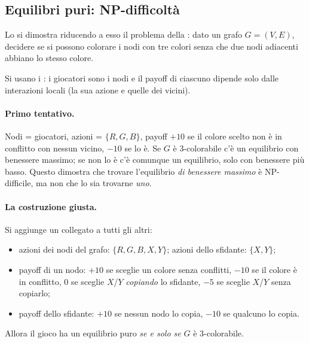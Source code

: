 \subsection{Equilibri puri: NP-difficoltà}

 Lo si dimostra riducendo a esso
il problema della : dato un grafo $G = (V,E)$, decidere se si possono
colorare i nodi con tre colori senza che due nodi adiacenti abbiano lo stesso colore.

Si usano i : i giocatori sono i nodi e il payoff di ciascuno dipende
solo dalle interazioni locali (la sua azione e quelle dei vicini).

\paragraph{Primo tentativo.}
Nodi = giocatori, azioni = $\{R, G, B\}$, payoff $+10$ se il colore scelto non è in
conflitto con nessun vicino, $-10$ se lo è. Se $G$ è 3-colorabile c'è un equilibrio con
benessere massimo; se non lo è c'è comunque un equilibrio, solo con benessere più basso.
Questo dimostra che trovare l'equilibrio \emph{di benessere massimo} è NP-difficile, ma non
che lo sia trovarne \emph{uno}.

\paragraph{La costruzione giusta.}
Si aggiunge un  collegato a tutti gli altri:
\begin{itemize}
  \item azioni dei nodi del grafo: $\{R, G, B, X, Y\}$; azioni dello sfidante: $\{X, Y\}$;
  \item payoff di un nodo: $+10$ se sceglie un colore senza conflitti, $-10$ se il colore è
        in conflitto, $0$ se sceglie $X$/$Y$ \emph{copiando} lo sfidante, $-5$ se sceglie
        $X$/$Y$ senza copiarlo;
  \item payoff dello sfidante: $+10$ se nessun nodo lo copia, $-10$ se qualcuno lo copia.
\end{itemize}
Allora il gioco ha un equilibrio puro \emph{se e solo se} $G$ è 3-colorabile.


